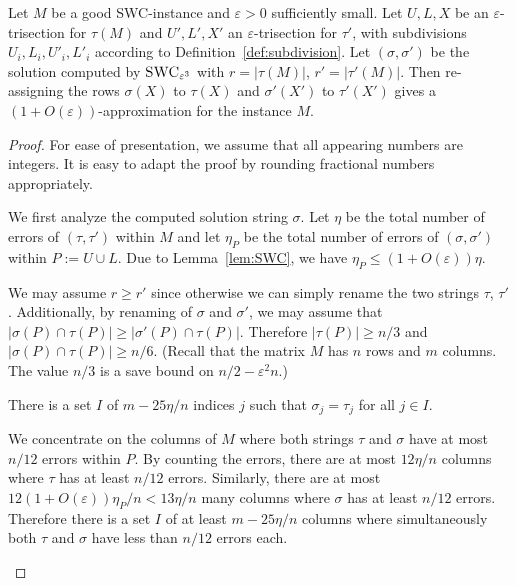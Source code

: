\begin{lemma}
    \label{lem:swc-gap}
    Let $M$ be a good SWC-instance and $\varepsilon > 0$ sufficiently small.
    Let $U,L,X$ be an $\varepsilon$-trisection for $\tau(M)$ and $U',L',X'$ an $\varepsilon$-trisection for $\tau'$, with subdivisions $U_i,L_i,U'_i,L'_i$ according to Definition~\ref{def:subdivision}.
    Let $(\sigma, \sigma')$ be the solution computed by $\textsc{SWC}_{\varepsilon^3}$ with $r = |\tau(M)|$, $r' = |\tau'(M)|$.
    Then re-assigning the rows $\sigma(X)$ to $\tau(X)$ and $\sigma'(X')$ to $\tau'(X')$ gives a $(1 + O(\varepsilon))$-approximation for the instance $M$.
\end{lemma}
\begin{proof}
    For ease of presentation, we assume that all appearing numbers are integers.
    It is easy to adapt the proof by rounding fractional numbers appropriately.

    We first analyze the computed solution string $\sigma$. 
    Let $\eta$ be the total number of errors of $(\tau,\tau')$ within $M$ and
    let $\eta_P$ be the total number of errors of $(\sigma,\sigma')$ within $P := U \cup L$.
    Due to Lemma~\ref{lem:SWC}, we have $\eta_P \le (1+O(\varepsilon)) \eta$.

    We may assume $r \ge r'$ since otherwise we can simply rename the two strings $\tau$, $\tau'$.
    Additionally, by renaming of $\sigma$ and $\sigma'$, we may assume that $|\sigma(P) \cap \tau(P)| \ge |\sigma'(P) \cap \tau(P)|$.
    Therefore $|\tau(P)| \ge n/3$ and $|\sigma(P) \cap \tau(P)| \ge n/6$.
    (Recall that the matrix $M$ has $n$ rows and $m$ columns. The value $n/3$ is a save bound on $n/2 - \varepsilon^2 n$.)

    \begin{claim}\label{claim:agree}
        There is a set $I$ of $m - 25\eta/n$ indices $j$ such that
        $\sigma_j = \tau_j$ for all $j \in I$.
    \end{claim}
    \begin{subproof}
        We concentrate on the columns of $M$ where both strings $\tau$ and $\sigma$ have at most $n/12$ errors within $P$.
        By counting the errors, there are at most $12 \eta/n$ columns where $\tau$ has at least $n/12$ errors.
        Similarly, there are at most $12 (1+O(\varepsilon)) \eta_P/ n < 13 \eta/ n$ many columns where $\sigma$ has at least $n/12$ errors.
        Therefore there is a set $I$ of at least $m - 25\eta/n$ columns where simultaneously both $\tau$ and $\sigma$ have less than $n/12$ errors each.


\end{subproof}
\end{proof}

